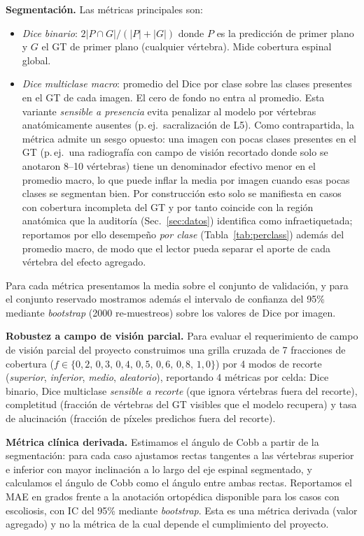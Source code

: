 \documentclass[conference]{IEEEtran}
\begin{document}
\textbf{Segmentación.} Las métricas principales son:
\begin{itemize}
  \item \emph{Dice binario}: $2|P \cap G| / (|P| + |G|)$ donde $P$ es la predicción de primer plano y $G$ el GT de primer plano (cualquier vértebra). Mide cobertura espinal global.
  \item \emph{Dice multiclase macro}: promedio del Dice por clase sobre las clases presentes en el GT de cada imagen. El cero de fondo no entra al promedio. Esta variante \emph{sensible a presencia} evita penalizar al modelo por vértebras anatómicamente ausentes (p.\,ej.\ sacralización de L5). Como contrapartida, la métrica admite un sesgo opuesto: una imagen con pocas clases presentes en el GT (p.\,ej.\ una radiografía con campo de visión recortado donde solo se anotaron 8--10 vértebras) tiene un denominador efectivo menor en el promedio macro, lo que puede inflar la media por imagen cuando esas pocas clases se segmentan bien. Por construcción esto solo se manifiesta en casos con cobertura incompleta del GT y por tanto coincide con la región anatómica que la auditoría (Sec.~\ref{sec:datos}) identifica como infraetiquetada; reportamos por ello desempeño \emph{por clase} (Tabla~\ref{tab:perclass}) además del promedio macro, de modo que el lector pueda separar el aporte de cada vértebra del efecto agregado.
\end{itemize}
Para cada métrica presentamos la media sobre el conjunto de validación, y para el conjunto reservado mostramos además el intervalo de confianza del 95\% mediante \emph{bootstrap} (2000 re-muestreos) sobre los valores de Dice por imagen.

\textbf{Robustez a campo de visión parcial.} Para evaluar el requerimiento de campo de visión parcial del proyecto construimos una grilla cruzada de 7 fracciones de cobertura ($f \in \{0{,}2,\,0{,}3,\,0{,}4,\,0{,}5,\,0{,}6,\,0{,}8,\,1{,}0\}$) por 4 modos de recorte (\emph{superior}, \emph{inferior}, \emph{medio}, \emph{aleatorio}), reportando 4 métricas por celda: Dice binario, Dice multiclase \emph{sensible a recorte} (que ignora vértebras fuera del recorte), completitud (fracción de vértebras del GT visibles que el modelo recupera) y tasa de alucinación (fracción de píxeles predichos fuera del recorte).

\textbf{Métrica clínica derivada.} Estimamos el ángulo de Cobb a partir de la segmentación: para cada caso ajustamos rectas tangentes a las vértebras superior e inferior con mayor inclinación a lo largo del eje espinal segmentado, y calculamos el ángulo de Cobb como el ángulo entre ambas rectas. Reportamos el MAE en grados frente a la anotación ortopédica disponible para los casos con escoliosis, con IC del 95\% mediante \emph{bootstrap}. Esta es una métrica derivada (valor agregado) y no la métrica de la cual depende el cumplimiento del proyecto.
\end{document}
